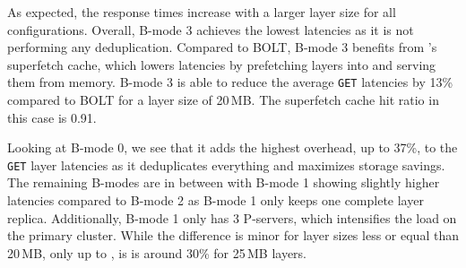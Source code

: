 As expected, the response times increase with a larger layer size for all configurations.
%
Overall, B-mode 3 achieves the lowest latencies as it is not performing any deduplication.
%
Compared to BOLT, B-mode 3 benefits from \sysname{}'s superfetch cache, which
lowers latencies by prefetching layers into and serving them from memory.
%
B-mode 3 is able to reduce the average \texttt{GET} latencies by 13\% compared to
BOLT for a layer size of 20\,MB.
%
%
The superfetch cache hit ratio in this case is 0.91.
%

Looking at B-mode 0, we see that it adds the highest overhead, up to 37\%, to
the \texttt{GET} layer latencies as it deduplicates everything and maximizes
storage savings.
%
%
%
The remaining B-modes are in between with B-mode 1 showing slightly higher
latencies compared to B-mode 2 as B-mode 1 only keeps one complete layer
replica.
%
Additionally, B-mode 1 only has 3 P-servers, which intensifies the load on
the primary cluster.
%
%
While the difference is minor for layer sizes less or equal than 20\,MB, only
up to \gap, is is around 30\% for 25\,MB layers.

